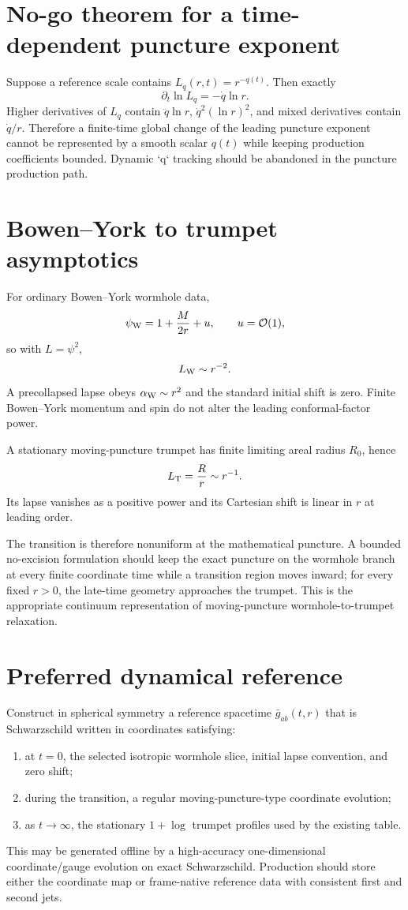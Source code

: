 \documentclass[11pt]{article}
\newcommand{\bg}{\bar g}
\newcommand{\order}{\mathcal O}
\begin{document}
\section{No-go theorem for a time-dependent puncture exponent}
Suppose a reference scale contains $L_q(r,t)=r^{-q(t)}$. Then exactly
\begin{equation}
\boxed{\partial_t\ln L_q=-\dot q\ln r.}
\label{eq:qlog}
\end{equation}
Higher derivatives of $L_q$ contain $\ddot q\ln r$, $\dot q^2(\ln r)^2$, and mixed derivatives contain $\dot q/r$. Therefore a finite-time global change of the leading puncture exponent cannot be represented by a smooth scalar $q(t)$ while keeping production coefficients bounded. Dynamic `q` tracking should be abandoned in the puncture production path.

\section{Bowen--York to trumpet asymptotics}
For ordinary Bowen--York wormhole data,
\[
\psi_{\rm W}=1+\frac{M}{2r}+u,\qquad u=\order(1),
\]
so with $L=\psi^2$,
\[
L_{\rm W}\sim r^{-2}.
\]
A precollapsed lapse obeys $\alpha_{\rm W}\sim r^2$ and the standard initial shift is zero. Finite Bowen--York momentum and spin do not alter the leading conformal-factor power.

A stationary moving-puncture trumpet has finite limiting areal radius $R_0$, hence
\[
L_{\rm T}=\frac{R}{r}\sim r^{-1}.
\]
Its lapse vanishes as a positive power and its Cartesian shift is linear in $r$ at leading order.

The transition is therefore nonuniform at the mathematical puncture. A bounded no-excision formulation should keep the exact puncture on the wormhole branch at every finite coordinate time while a transition region moves inward; for every fixed $r>0$, the late-time geometry approaches the trumpet. This is the appropriate continuum representation of moving-puncture wormhole-to-trumpet relaxation.

\section{Preferred dynamical reference}
Construct in spherical symmetry a reference spacetime $\bg_{ab}(t,r)$ that is Schwarzschild written in coordinates satisfying:
\begin{enumerate}
\item at $t=0$, the selected isotropic wormhole slice, initial lapse convention, and zero shift;
\item during the transition, a regular moving-puncture-type coordinate evolution;
\item as $t\to\infty$, the stationary $1+\log$ trumpet profiles used by the existing table.
\end{enumerate}
This may be generated offline by a high-accuracy one-dimensional coordinate/gauge evolution on exact Schwarzschild. Production should store either the coordinate map or frame-native reference data with consistent first and second jets.
\end{document}

